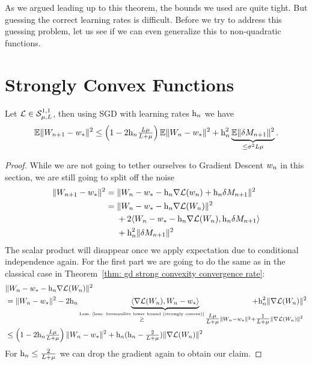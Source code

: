 As we argued leading up to this theorem, the bounds
we used are quite tight. But guessing the correct learning rates is difficult.
Before we try to address this guessing problem, let us see if we can even
generalize this to non-quadratic functions.


\section{Strongly Convex Functions}

\begin{lemma}\label{lem: SGD bound with noise}
	Let \(\mathcal{L}\in\mathcal{S}^{1,1}_{{\mu},{L}}\), then using SGD with learning
	rates \(\text{h}_n\) we have
	\begin{align*}
		\mathbb{E}\|W_{n+1} - w_*\|^2
		\le \left(1-2\text{h}_n\tfrac{L\mu}{L+\mu}\right)
		\mathbb{E}\|W_n - w_*\|^2 + \text{h}_n^2 \underbrace{\mathbb{E}\|\delta M_{n+1}\|^2}_{\le\sigma^2L\mu}.
	\end{align*}
\end{lemma}
\begin{proof}
	While we are not going to tether ourselves to Gradient Descent \(w_n\) in
	this section, we are still going to split off the noise
	\begin{align*}
		\|W_{n+1} - w_*\|^2
		&= \|W_n -w_* - \text{h}_n\nabla\mathcal{L}(w_n) +\text{h}_n \delta M_{n+1}\|^2\\
		&= \begin{aligned}[t]
			&\|W_n - w_* - \text{h}_n\nabla\mathcal{L}(W_n)\|^2\\
			&+ 2\langle W_n - w_* - \text{h}_n\nabla\mathcal{L}(W_n), \text{h}_n \delta M_{n+1}\rangle\\
			&+ \text{h}_n^2 \|\delta M_{n+1}\|^2
		\end{aligned}
	\end{align*}
	The scalar product will disappear once we apply expectation due to conditional
	independence again. For the first part we are going to do the same as in the
	classical case in Theorem~\ref{thm: gd strong convexity convergence rate}:
	\begin{align}
		\nonumber
		&\|\Weights_n - \minimum - \lr_n\nabla\Loss(\Weights_n)\|^2\\
		\label{eq: getting rid of the scalar product (SGD)}
		&= \|\Weights_n - \minimum\|^2
		- 2\lr_n\underbrace{\langle\nabla\Loss(\Weights_n), \Weights_n-\minimum\rangle}_{
			\xge{\text{Lem.~\ref{lem: bermanDiv lower bound (strongly convex)}}}
			\tfrac{\ubound\lbound}{\ubound+\lbound}\|\Weights_n - \minimum\|^2
			\mathrlap{+ \tfrac{1}{\ubound+\lbound}\|\nabla\Loss(\Weights_n)\|^2}
		}
		+ \lr_n^2 \|\nabla\Loss(\Weights_n)\|^2\\
		\nonumber
		&\le \left(1-2\lr_n\tfrac{\ubound\lbound}{\ubound+\lbound}\right)
		\|\Weights_n - \minimum\|^2
		+ \lr_n(\lr_n - \tfrac{2}{\ubound+\lbound})
		\|\nabla\Loss(\Weights_n)\|^2
	\end{align}
	For \(\text{h}_n\le\tfrac{2}{L+\mu}\) we can drop the gradient again to
	obtain our claim.
\end{proof}

